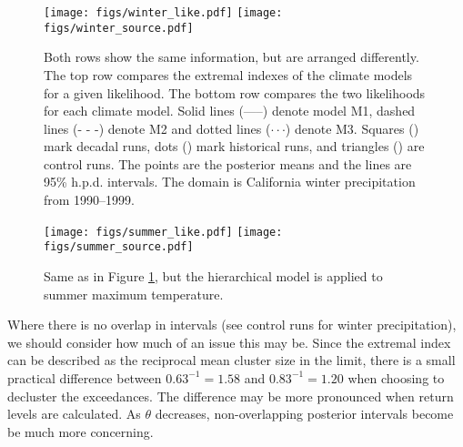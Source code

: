 \begin{figure}
\begin{center}
\texttt{[image: figs/winter\_like.pdf]}
\texttt{[image: figs/winter\_source.pdf]}
\end{center}
\caption{Both rows show the same information, but are arranged differently. The top row compares the extremal indexes of the climate models for a given likelihood. The bottom row compares the two likelihoods for each climate model. Solid lines (-----) denote model M1, dashed lines (- - -) denote M2 and dotted lines ($\cdot\cdot\cdot$) denote M3. Squares (\symsquare) mark decadal runs, dots (\symcircle) mark historical runs, and triangles (\symtriangle) are control runs. The points are the posterior means and the lines are 95\% h.p.d. intervals. The domain is California winter precipitation from 1990--1999.}
\label{figwinter}
\end{figure}

\begin{figure}
\begin{center}
\texttt{[image: figs/summer\_like.pdf]}
\texttt{[image: figs/summer\_source.pdf]}
\end{center}
\caption{Same as in Figure \ref{figwinter}, but the hierarchical model is applied to summer maximum temperature.}
\label{figsummer}
\end{figure}

Where there is no overlap in intervals (see control runs for winter precipitation), we should consider how much of an issue this may be. Since the extremal index can be described as the reciprocal mean cluster size in the limit, there is a small practical difference between $0.63^{-1}=1.58$ and $0.83^{-1}=1.20$ when choosing to decluster the exceedances. The difference may be more pronounced when return levels are calculated. As $\theta$ decreases, non-overlapping posterior intervals become be much more concerning.
